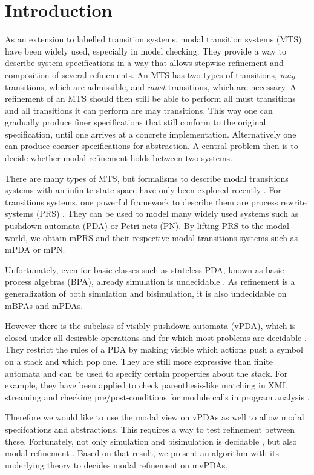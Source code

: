 
\newpage

\chapter{Introduction}

As an extension to labelled transition systems,
modal transition systems (MTS) \cite{LarsenT88}
have been widely used, especially in model checking.
They provide a way to describe system specifications
in a way that allows stepwise refinement
and composition of several refinements.
An MTS has two types of transitions, \emph{may} transitions, which are admissible,
and \emph{must} transitions, which are necessary.
A refinement of an MTS should then still be able to perform
all must transitions and all transitions it can perform are may transitions.
This way one can gradually produce finer specifications that still conform
to the original specification, until one arrives at a concrete implementation.
Alternatively one can produce coarser specifications for abstraction.
A central problem then is to decide whether modal refinement holds between
two systems.

There are many types of MTS, 
but formalisms to describe modal transitions systems with
an infinite state space have only been explored recently \cite{BenesK12}.
For transitions systems, one powerful framework to describe them are
process rewrite systems (PRS) \cite{Mayr00, Esparza01}.
They can be used to model many widely used systems
such as pushdown automata (PDA) or Petri nets (PN).
By lifting PRS to the modal world, we obtain mPRS
and their respective modal transitions systems such as
mPDA or mPN.

Unfortunately, even for basic classes such as
stateless PDA, known as basic process algebras (BPA), already simulation is
undecidable \cite{GrooteH94}.
As refinement is a generalization of both simulation and bisimulation,
it is also undecidable on mBPAs and mPDAs.

However there is the subclass of visibly pushdown automata (vPDA),
which is closed under all desirable operations
and for which most problems are decidable \cite{AlurM04}.
They restrict the rules of a PDA by making visible which
actions push a symbol on a stack and which pop one.
They are still more expressive than finite automata 
and can be used to specify certain properties about the stack.
For example, they have been applied to check
parenthesis-like matching in XML streaming
\cite{KumarMV07}
and checking pre/post-conditions for module calls
in program analysis \cite{AlurEM04}.

Therefore we would like to use the modal view on vPDAs
as well to allow modal specifcations and abstractions.
This requires a way to test refinement between these.
Fortunately, not only simulation and bisimulation
is decidable \cite{Srba06},
but also modal refinement \cite{BenesK12}.
Based on that result, we present
an algorithm with its underlying theory
to decides modal refinement on mvPDAs.



